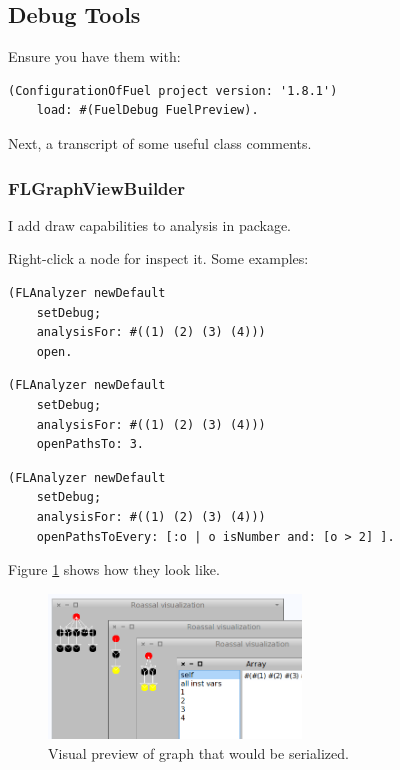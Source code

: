 \documentclass[a4paper,10pt,twoside]{book}
\begin{document}
\subsection{Debug Tools}
Ensure you have them with:

\begin{lstlisting}
(ConfigurationOfFuel project version: '1.8.1') 
    load: #(FuelDebug FuelPreview).
\end{lstlisting}

Next, a transcript of some useful class comments. 

\subsubsection{FLGraphViewBuilder}
I add draw capabilities to analysis in  package.

Right-click a node for inspect it. Some examples:

\begin{lstlisting}
(FLAnalyzer newDefault
    setDebug;
    analysisFor: #((1) (2) (3) (4)))
    open.
\end{lstlisting}

\begin{lstlisting}
(FLAnalyzer newDefault
    setDebug;
    analysisFor: #((1) (2) (3) (4)))
    openPathsTo: 3.
\end{lstlisting}
    
\begin{lstlisting}
(FLAnalyzer newDefault
    setDebug;
    analysisFor: #((1) (2) (3) (4)))
    openPathsToEvery: [:o | o isNumber and: [o > 2] ].
\end{lstlisting}

Figure \ref{figFuelPreview} shows how they look like.

\begin{figure}[h!tbp]
	\begin{center}
		\includegraphics[width=0.6\textwidth]{figures/FuelPreview.png}
		\caption{Visual preview of graph that would be serialized.\label{figFuelPreview}}
	\end{center}
\end{figure}
\end{document}
